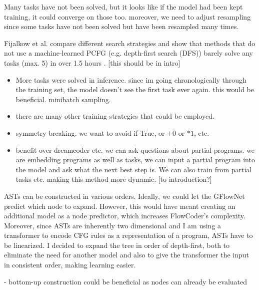 Many tasks have not been solved, but it looks like if the model had been kept training, it could converge on those too.
moreover, we need to adjust resampling since some tasks have not been solved but have been resampled many times.










Fijalkow et al. compare different search strategies and show that methods that do not use a machine-learned PCFG (e.g. depth-first search (DFS)) barely solve any tasks (max. 5) in over 1.5 hours \cite{fijalkow_scaling_2021}. [this should be in intro]


\begin{itemize}
    \item More tasks were solved in inference. since im going chronologically through the training set, the model doesn't see the first task ever again. this would be beneficial. minibatch sampling. 
    \item there are many other training strategies that could be employed.
    \item symmetry breaking. we want to avoid if True, or $+0$ or $*1$, etc.
\end{itemize}


\begin{itemize}
    \item benefit over dreamcoder etc. we can ask questions about partial programs. we are embedding programs as well as tasks, we can input a partial program into the model and ask what the next best step is. We can also train from partial tasks etc. making this method more dynamic. [to introduction?]
\end{itemize}


ASTs can be constructed in various orders. Ideally, we could let the GFlowNet predict which node to expand. However, this would have meant creating an additional model as a node predictor, which increases FlowCoder's complexity. Moreover, since ASTs are inherently two dimensional and I am using a transformer to encode CFG rules as a representation of a program, ASTs have to be linearized. I decided to expand the tree in order of depth-first, both to eliminate the need for another model and also to give the transformer the input in consistent order, making learning easier. 

- bottom-up construction could be beneficial as nodes can already be evaluated



